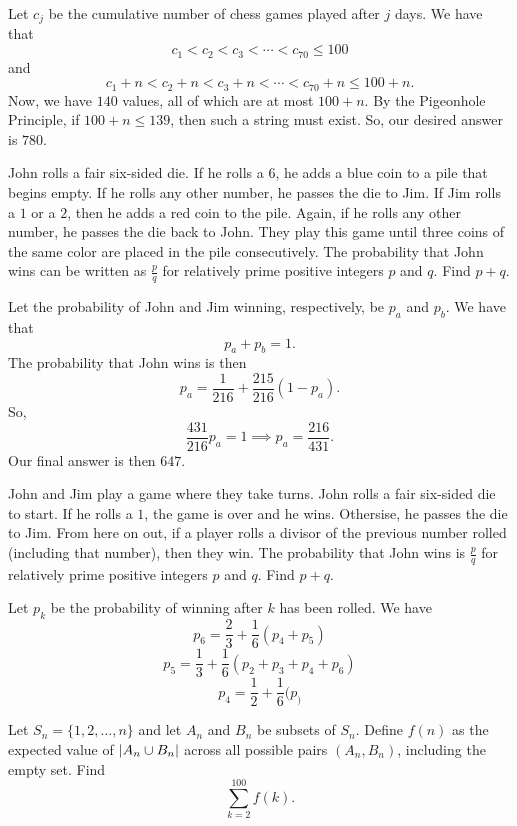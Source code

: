\documentclass[11pt]{scrartcl}
\begin{document}
Let $c_{j}$ be the cumulative number of chess games played after $j$ days. We have that
\[c_{1} < c_{2} < c_{3} < \cdots < c_{70} \leq 100\]
and
\[c_{1} + n < c_{2} + n < c_{3} + n < \cdots < c_{70} + n \leq 100 + n .\]
Now, we have $140$ values, all of which are at most $100 + n$. By the Pigeonhole Principle, if $100 + n \leq 139$, then such a string must exist. So, our desired answer is $\boxed{780}$.

\begin{problem}
    John rolls a fair six-sided die. If he rolls a $6$, he adds a blue coin to a pile that begins empty. If he rolls any other number, he passes the die to Jim. If Jim rolls a $1$ or a $2$, then he adds a red coin to the pile. Again, if he rolls any other number, he passes the die back to John. They play this game until three coins of the same color are placed in the pile consecutively. The probability that John wins can be written as $\frac{p}{q}$ for relatively prime positive integers $p$ and $q$. Find $p + q$.
\end{problem}

Let the probability of John and Jim winning, respectively, be $p_{a}$ and $p_{b}$. We have that
\[p_{a} + p_{b} = 1.\]
The probability that John wins is then
\[p_{a} = \frac{1}{216} + \frac{215}{216}(1 - p_{a}).\]
So,
\[\frac{431}{216}p_{a} = 1 \implies p_{a} = \frac{216}{431}.\]
Our final answer is then $\boxed{647}$.

\begin{problem}
    John and Jim play a game where they take turns. John rolls a fair six-sided die to start. If he rolls a $1$, the game is over and he wins. Othersise, he passes the die to Jim. From here on out, if a player rolls a divisor of the previous number rolled (including that number), then they win. The probability that John wins is $\frac{p}{q}$ for relatively prime positive integers $p$ and $q$. Find $p + q$.
\end{problem}

Let $p_{k}$ be the probability of winning after $k$ has been rolled. We have
\[p_{6} = \frac{2}{3} + \frac{1}{6}(p_{4} + p_{5})\]
\[p_{5} = \frac{1}{3} + \frac{1}{6}(p_{2} + p_{3} + p_{4} + p_{6})\]
\[p_{4} = \frac{1}{2} + \frac{1}{6}(p_)\]

\begin{problem}
    Let $S_{n} = \{1, 2, \dots, n\}$ and let $A_{n}$ and $B_{n}$ be subsets of $S_{n}$. Define $f(n)$ as the expected value of $\left\lvert A_{n} \cup B_{n} \right\rvert$ across all possible pairs $(A_{n},B_{n})$, including the empty set. Find
    \[\sum_{k = 2}^{100} f(k).\]
\end{problem}
\end{document}
